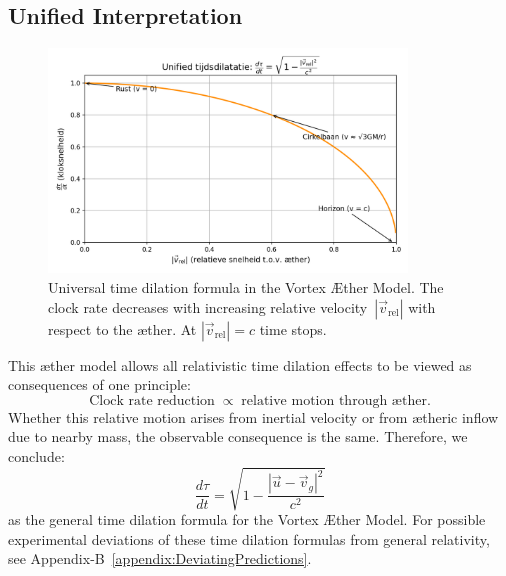 \subsection*{Unified Interpretation}

\begin{figure}[htbp]
    \centering
    \includegraphics[width=0.85\textwidth]{../11-TijdsvertragingRelatieveBeweging}
    \caption{Universal time dilation formula in the Vortex Æther Model. The clock rate decreases with increasing relative velocity~$|\vec{v}_{\mathrm{rel}}|$ with respect to the æther. At $|\vec{v}_{\mathrm{rel}}| = c$ time stops.}
    \label{fig:TijdsvertragingRelatieveBeweging}
\end{figure}

This æther model allows all relativistic time dilation effects to be viewed as consequences of one principle:
\[
\text{Clock rate reduction} \;\propto\; \text{relative motion through æther}.
\]
Whether this relative motion arises from inertial velocity or from ætheric inflow due to nearby mass, the observable consequence is the same. Therefore, we conclude:
\[
\boxed{\frac{d\tau}{dt} = \sqrt{1 - \frac{|\vec{u} - \vec{v}_g|^2}{c^2}}}
\]
as the general time dilation formula for the Vortex Æther Model.
For possible experimental deviations of these time dilation formulas from general relativity, see Appendix-B~\ref{appendix:DeviatingPredictions}.